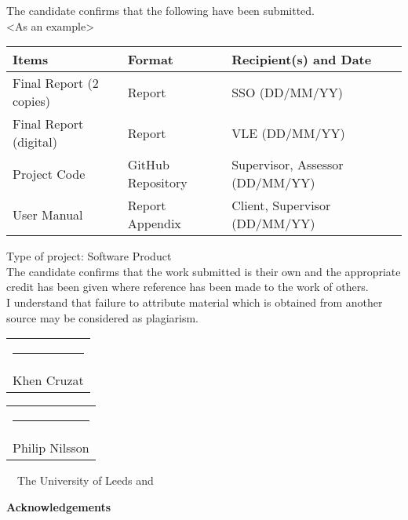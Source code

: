 \frontcover

\clearpage
\noindent The candidate confirms that the following have been submitted.\\
<As an example>
\begin{table}[ht!]
\begin{tabular}{|p{}|p{}|p{}|}
\hline 
Items & Format & Recipient(s) and Date \\ 
\hline 
Final Report (2 copies) & Report & SSO (DD/MM/YY) \\ 
\hline 
Final Report (digital) & Report & VLE (DD/MM/YY) \\ 
\hline 
Project Code & GitHub Repository & Supervisor, Assessor (DD/MM/YY) \\ 
\hline 
User Manual & Report Appendix & Client, Supervisor (DD/MM/YY) \\ 
\hline 
\end{tabular} 
\end{table}

\noindent Type of project: Software Product
\vspace{\fill}\\
\noindent The candidate confirms that the work submitted is their own and the appropriate credit has been given where reference has been made to the work of others.
\vspace{\fill}\\
\noindent I understand that failure to attribute material which is obtained from another source may be considered as plagiarism.
\vspace{\fill}\\
\begin{tabular}[t]{@{}l} 
  \rule{50mm}{1pt}\\  Khen Cruzat
\end{tabular}
\hfill%
\begin{tabular}[t]{l@{}}
   \rule{50mm}{1pt}\\ Philip Nilsson
\end{tabular}
\flushleft 
\vspace{\fill}
\textcopyright~\session~The University of Leeds and~\fullname

\begin{dissertationsummary}

\end{dissertationsummary}

\clearpage
\centering\textbf{Acknowledgements}
\flushleft


\tableofcontents


